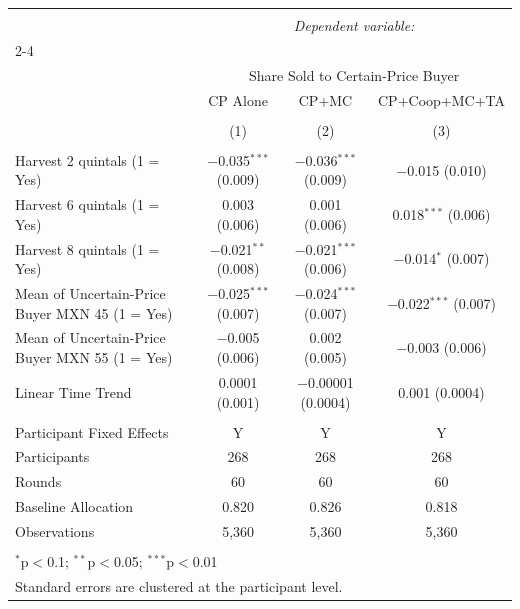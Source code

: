 
\begin{table}[!htbp] \centering 
   
   
\begin{tabular}{@{\extracolsep{5pt}}lccc} 
\\[-1.8ex]\hline 
\hline \\[-1.8ex] 
 & \multicolumn{3}{c}{\textit{Dependent variable:}} \\ 
\cline{2-4} 
\\[-1.8ex] & \multicolumn{3}{c}{Share Sold to Certain-Price Buyer} \\ 
 & CP Alone & CP+MC & CP+Coop+MC+TA \\ 
\\[-1.8ex] & (1) & (2) & (3)\\ 
\hline \\[-1.8ex] 
 Harvest 2 quintals (1 = Yes) & $-$0.035$^{***}$ (0.009) & $-$0.036$^{***}$ (0.009) & $-$0.015 (0.010) \\ 
  Harvest 6 quintals (1 = Yes) & 0.003 (0.006) & 0.001 (0.006) & 0.018$^{***}$ (0.006) \\ 
  Harvest 8 quintals (1 = Yes) & $-$0.021$^{**}$ (0.008) & $-$0.021$^{***}$ (0.006) & $-$0.014$^{*}$ (0.007) \\ 
  Mean of Uncertain-Price Buyer MXN 45 (1 = Yes) & $-$0.025$^{***}$ (0.007) & $-$0.024$^{***}$ (0.007) & $-$0.022$^{***}$ (0.007) \\ 
  Mean of Uncertain-Price Buyer MXN 55 (1 = Yes) & $-$0.005 (0.006) & 0.002 (0.005) & $-$0.003 (0.006) \\ 
  Linear Time Trend & 0.0001 (0.001) & $-$0.00001 (0.0004) & 0.001 (0.0004) \\ 
 \hline \\[-1.8ex] 
Participant Fixed Effects & Y & Y & Y \\ 
Participants & 268 & 268 & 268 \\ 
Rounds & 60 & 60 & 60 \\ 
Baseline Allocation & 0.820 & 0.826 & 0.818 \\ 
Observations & 5,360 & 5,360 & 5,360 \\ 
\hline 
\hline \\[-1.8ex] 
\multicolumn{4}{l}{$^{*}$p$<$0.1; $^{**}$p$<$0.05; $^{***}$p$<$0.01} \\ 
\multicolumn{4}{l}{Standard errors are clustered at the participant level.} \\ 

\end{tabular}
\end{table}
